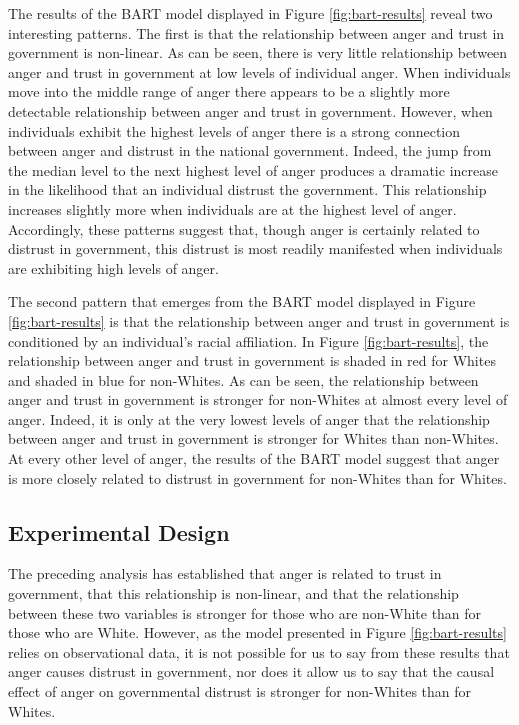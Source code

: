 \documentclass[12t, letterpaper]{article}
\begin{document}
The results of the BART model displayed in Figure \ref{fig:bart-results} reveal two interesting patterns. The first is that the relationship between anger and trust in government is non-linear. As can be seen, there is very little relationship between anger and trust in government at low levels of individual anger. When individuals move into the middle range of anger there appears to be a slightly more detectable relationship between anger and trust in government. However, when individuals exhibit the highest levels of anger there is a strong connection between anger and distrust in the national government. Indeed, the jump from the median level to the next highest level of anger produces a dramatic increase in the likelihood that an individual distrust the government. This relationship increases slightly more when individuals are at the highest level of anger. Accordingly, these patterns suggest that, though anger is certainly related to distrust in government, this distrust is most readily manifested when individuals are exhibiting high levels of anger.

The second pattern that emerges from the BART model displayed in Figure \ref{fig:bart-results} is that the relationship between anger and trust in government is conditioned by an individual's racial affiliation. In Figure \ref{fig:bart-results}, the relationship between anger and trust in government is shaded in red for Whites and shaded in blue for non-Whites. As can be seen, the relationship between anger and trust in government is stronger for non-Whites at almost every level of anger. Indeed, it is only at the very lowest levels of anger that the relationship between anger and trust in government is stronger for Whites than non-Whites. At every other level of anger, the results of the BART model suggest that anger is more closely related to distrust in government for non-Whites than for Whites.

\subsection{Experimental Design}
\label{subsec:experiment}

The preceding analysis has established that anger is related to trust in government, that this relationship is non-linear, and that the relationship between these two variables is stronger for those who are non-White than for those who are White. However, as the model presented in Figure \ref{fig:bart-results} relies on observational data, it is not possible for us to say from these results that anger causes distrust in government, nor does it allow us to say that the causal effect of anger on governmental distrust is stronger for non-Whites than for Whites.
\end{document}
